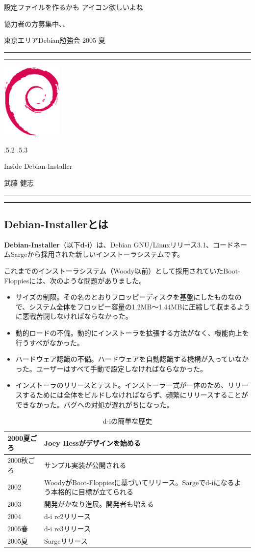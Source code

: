 \documentclass[mingoth,a4paper]{jsarticle}
\makeatletter
\renewcommand{\section}{\@startsection{section}{1}{\z@}%
    {\Cvs \@plus.5\Cdp \@minus.2\Cdp}%
    {.5\Cvs \@plus.3\Cdp}%
    {\normalfont\Large\headfont\raggedright\centering}} %
\newcommand{\dancersection}[2]{%
\newpage
東京エリアDebian勉強会 2005 夏
\hrule
\vspace{0.5mm}
\hrule
\hfill{}\includegraphics[width=3cm]{image200502/openlogo-nd.eps}\\
\vspace{-4cm}
\begin{center}
  \section{#1}
\end{center}
\hfill{}#2\hspace{3cm}\space\\
\hrule
\hrule
\vspace{1cm}
}
\makeatother
\begin{document}
     設定ファイルを作るかも
     アイコン欲しいよね

   協力者の方募集中、、



\dancersection{Inside Debian-Installer}{武藤 健志}
\label{sec:inst}


\subsection{Debian-Installerとは}
\label{sec:whatd-i}

\textbf{Debian-Installer}（以下\textbf{d-i}）は、Debian GNU/Linuxリリース3.1、コードネームSargeから採用された新しいインストーラシステムです。

これまでのインストーラシステム（Woody以前）として採用されていたBoot-Floppiesには、次のような問題がありました。

\begin{itemize}
\item サイズの制限。その名のとおりフロッピーディスクを基盤にしたものなので、システム全体をフロッピー容量の1.2MB〜1.44MBに圧縮して収まるように悪戦苦闘しなければならなかった。
\item 動的ロードの不備。動的にインストーラを拡張する方法がなく、機能向上を行うすべがなかった。
\item ハードウェア認識の不備。ハードウェアを自動認識する機構が入っていなかった。ユーザーはすべて手動で設定しなければならなかった。
\item インストーラのリリースとテスト。インストーラ一式が一体のため、リリースするためには全体をビルドしなければならず、頻繁にリリースすることができなかった。バグへの対処が遅れがちになった。
\end{itemize}

\begin{table}[htbp]
  \begin{tabular}[htbp]{|l|p{10cm}|}\hline
    2000夏ごろ&Joey Hessがデザインを始める\\ \hline
    2000秋ごろ&サンプル実装が公開される\\ \hline
    2002&WoodyがBoot-Floppiesに基づいてリリース。Sargeでd-iになるよう本格的に目標が立てられる\\ \hline
    2003&開発がかなり進展。開発者も増える\\ \hline
    2004&d-i rc2リリース\\ \hline
    2005春&d-i rc3リリース\\ \hline
    2005夏&Sargeリリース\\ \hline
  \end{tabular}
  \caption{d-iの簡単な歴史}
  \label{tab:history}
\end{table}
\end{document}
